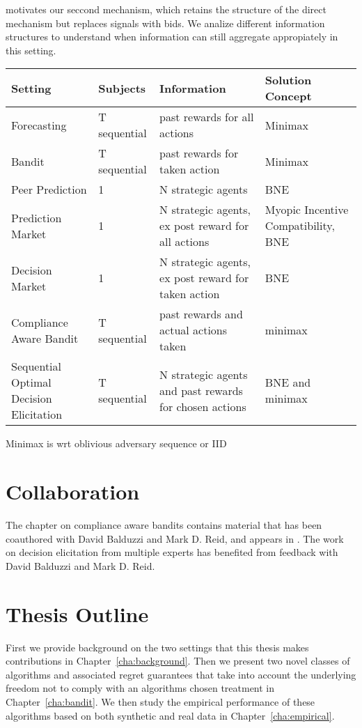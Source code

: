 motivates our seccond mechanism, which retains the structure of the direct mechanism but replaces signals with bids. We analize different information structures to understand when information can still aggregate appropiately in this setting.

\begin{tabular}{llll}
\toprule
Setting & Subjects & Information & Solution Concept\\
\midrule
Forecasting & T sequential & past rewards for all actions & Minimax  \\
Bandit & T sequential & past rewards for taken action  &  Minimax  \\
Peer Prediction & 1 & N strategic agents & BNE \\
Prediction Market & 1 & N strategic agents, ex post reward for all actions & Myopic Incentive Compatibility, BNE\\
Decision Market & 1 & N strategic agents, ex post reward for taken action & BNE  \\
Compliance Aware Bandit & T sequential & past rewards and actual actions taken & minimax \\
Sequential Optimal Decision Elicitation  & T sequential &  N strategic agents and past rewards for chosen actions & BNE and minimax \\
\bottomrule
\end{tabular}

Minimax is wrt oblivious adversary sequence or IID




\section{Collaboration}

The chapter on compliance aware bandits contains material that has been coauthored with David Balduzzi and Mark D. Reid, and appears in \cite{della2016compliance}. The work on decision elicitation from multiple experts has benefited from feedback with David Balduzzi and Mark D. Reid.


\section{Thesis Outline}
\label{sec:outline}

First we provide background on the two settings that this thesis makes contributions in  Chapter~\ref{cha:background}. Then we present two novel classes of algorithms and associated regret guarantees that take into account the underlying freedom not to comply with an algorithms chosen treatment in Chapter~\ref{cha:bandit}. We then study the empirical performance  of these algorithms based on both synthetic and real data in Chapter~\ref{cha:empirical}. 

